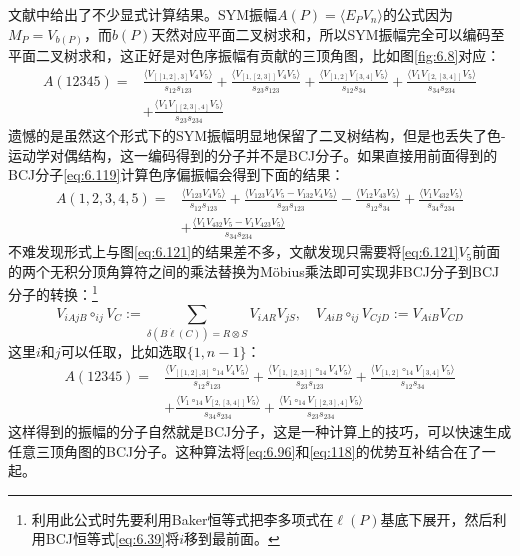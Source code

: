 文献\cite{Mafra:2011kj}中给出了不少显式计算结果。SYM振幅$A(P) = \langle E_P V_n \rangle$的公式因为$M_P=V_{b(P)}$，而$b(P)$天然对应平面二叉树求和，所以SYM振幅完全可以编码至平面二叉树求和，这正好是对色序振幅有贡献的三顶角图，比如图\ref{fig:6.8}对应：
\begin{equation}
	\label{eq:6.121}
\begin{aligned}
		A(12345)=&\frac{\langle V_{[[1,2],3]}V_4V_5\rangle}{s_{12}s_{123}}+\frac{\langle V_{[1,[2,3]]}V_4V_5\rangle}{s_{23}s_{123}}+\frac{\langle V_{[1,2]}V_{[3,4]}V_5\rangle}{s_{12}s_{34}}+\frac{\langle V_1V_{[2,[3,4]]}V_5\rangle}{s_{34}s_{234}}\\
		&+\frac{\langle V_1V_{[[2,3],4]}V_5\rangle}{s_{23}s_{234}}
\end{aligned}
\end{equation}
遗憾的是虽然这个形式下的SYM振幅明显地保留了二叉树结构，但是也丢失了色-运动学对偶结构，这一编码得到的分子并不是BCJ分子。如果直接用前面得到的BCJ分子\ref{eq:6.119}计算色序偏振幅会得到下面的结果：
\begin{equation}
\begin{aligned}
		A(1,2,3,4,5)=&\frac{\langle V_{123}V_4V_5\rangle}{s_{12}s_{123}}+\frac{\langle V_{123}V_4V_5-V_{132}V_4V_5\rangle}{s_{23}s_{123}}-\frac{\langle V_{12}V_{43}V_5\rangle}{s_{12}s_{34}}+\frac{\langle V_1V_{432}V_5\rangle}{s_{34}s_{234}}\\
		&+\frac{\langle V_1V_{432}V_5-V_1V_{423}V_5\rangle}{s_{34}s_{234}}
\end{aligned}
\end{equation}
不难发现形式上与图\ref{eq:6.121}的结果差不多，文献\cite{Mafra:2016ltu}发现只需要将\ref{eq:6.121}$V_5$前面的两个无积分顶角算符之间的乘法替换为M\"{o}bius乘法即可实现非BCJ分子到BCJ分子的转换：\footnote{利用此公式时先要利用Baker恒等式把李多项式在$\ell(P)$基底下展开，然后利用BCJ恒等式\ref{eq:6.39}将$i$移到最前面。}
\begin{equation}
	V_{iAjB}\circ_{ij}V_C:=\sum_{\delta(B\dot{\ell}(C))=R\otimes S}V_{iAR}V_{jS},\quad V_{AiB}\circ_{ij}V_{CjD}:=V_{AiB}V_{CD}
\end{equation}
这里$i$和$j$可以任取，比如选取$\{1,n-1\}$：
\begin{equation}
\begin{aligned}
		A(12345)=&\frac{\langle V_{[[1,2],3]}\circ_{14}V_4V_5\rangle}{s_{12}s_{123}}+\frac{\langle V_{[1,[2,3]]}\circ_{14}V_4V_5\rangle}{s_{23}s_{123}}+\frac{\langle V_{[1,2]}\circ_{14}V_{[3,4]}V_5\rangle}{s_{12}s_{34}}\\
		&+\frac{\langle V_1\circ_{14}V_{[2,[3,4]]}V_5\rangle}{s_{34}s_{234}}+\frac{\langle V_1\circ_{14}V_{[[2,3],4]}V_5\rangle}{s_{23}s_{234}}
\end{aligned}
\end{equation}
这样得到的振幅的分子自然就是BCJ分子，这是一种计算上的技巧，可以快速生成任意三顶角图的BCJ分子。这种算法将\ref{eq:6.96}和\ref{eq:118}的优势互补结合在了一起。

